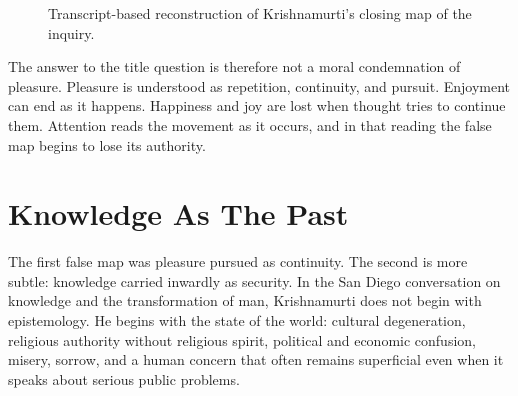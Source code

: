 \documentclass[11pt,oneside]{book}
\begin{document}
\begin{figure}
\centering
{}

Transcript-based reconstruction of Krishnamurti's closing map of the inquiry.
\end{figure}

The answer to the title question is therefore not a moral condemnation of pleasure. Pleasure is understood as repetition, continuity, and pursuit. Enjoyment can end as it happens. Happiness and joy are lost when thought tries to continue them. Attention reads the movement as it occurs, and in that reading the false map begins to lose its authority.


\chapter{Knowledge As The Past}

The first false map was pleasure pursued as continuity. The second is more subtle: knowledge carried inwardly as security. In the San Diego conversation on knowledge and the transformation of man, Krishnamurti does not begin with epistemology. He begins with the state of the world: cultural degeneration, religious authority without religious spirit, political and economic confusion, misery, sorrow, and a human concern that often remains superficial even when it speaks about serious public problems.
\end{document}
